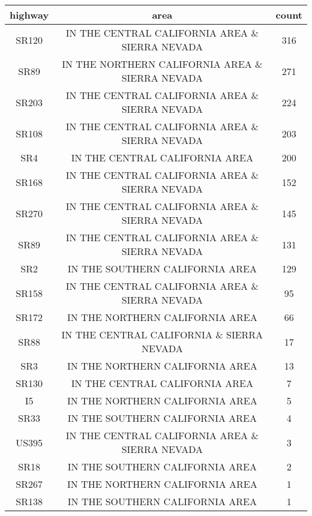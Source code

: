 \documentclass[12pt]{article}
\begin{document}
\begin{center}
        \hspace*{-1cm}
        \begin{tabular}{c|c|c}
                highway & area & count\\
                \hline
                SR120 & IN THE CENTRAL CALIFORNIA AREA \& SIERRA NEVADA & 316\\
                SR89  & IN THE NORTHERN CALIFORNIA AREA \& SIERRA NEVADA & 271\\
                SR203 & IN THE CENTRAL CALIFORNIA AREA \& SIERRA NEVADA & 224\\
                SR108 & IN THE CENTRAL CALIFORNIA AREA \& SIERRA NEVADA & 203\\
                SR4 & IN THE CENTRAL CALIFORNIA AREA & 200\\
                SR168 & IN THE CENTRAL CALIFORNIA AREA \& SIERRA NEVADA & 152\\
                SR270 & IN THE CENTRAL CALIFORNIA AREA \& SIERRA NEVADA & 145\\
                SR89 & IN THE CENTRAL CALIFORNIA AREA \& SIERRA NEVADA & 131\\
                SR2 & IN THE SOUTHERN CALIFORNIA AREA &   129\\
                SR158 & IN THE CENTRAL CALIFORNIA AREA \& SIERRA NEVADA  & 95\\
                SR172 & IN THE NORTHERN CALIFORNIA AREA & 66\\
                SR88 & IN THE CENTRAL CALIFORNIA \& SIERRA NEVADA & 17\\
                SR3 & IN THE NORTHERN CALIFORNIA AREA & 13\\
                SR130 & IN THE CENTRAL CALIFORNIA AREA & 7\\
                I5 & IN THE NORTHERN CALIFORNIA AREA & 5\\
                SR33 & IN THE SOUTHERN CALIFORNIA AREA & 4\\
                US395 & IN THE CENTRAL CALIFORNIA AREA \& SIERRA NEVADA & 3\\
                SR18 & IN THE SOUTHERN CALIFORNIA AREA & 2\\
                SR267 & IN THE NORTHERN CALIFORNIA AREA & 1\\
                SR138 & IN THE SOUTHERN CALIFORNIA AREA & 1
        \end{tabular}
        \hspace*{-1cm}
\end{center}
\end{document}
